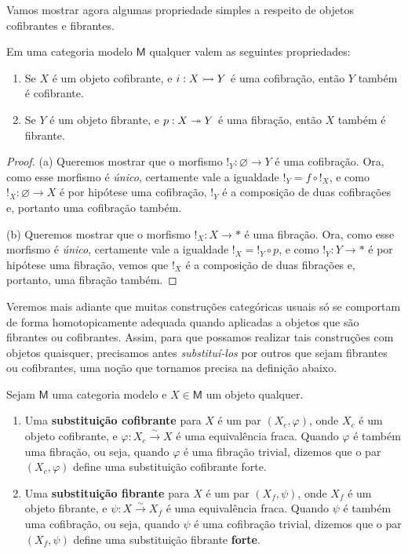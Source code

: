 Vamos mostrar agora algumas propriedade simples a respeito de objetos cofibrantes e fibrantes.

\begin{lema}\label{lema:props_obj_cofib_fib}
  Em uma categoria modelo $\mathsf{M}$ qualquer valem as seguintes propriedades:
  \begin{enumerate}
  \item[(a)] Se $X$ é um objeto cofibrante, e $i: X \rightarrowtail Y$ é uma cofibração, então $Y$ também é cofibrante.
    
  \item[(b)] Se $Y$ é um objeto fibrante, e $p: X \twoheadrightarrow Y$ é uma fibração, então $X$ também é fibrante.
  \end{enumerate}
\end{lema}

\begin{proof}
  (a) Queremos mostrar que o morfismo $!_{Y}: \varnothing \to Y$ é uma cofibração.
  Ora, como esse morfismo é \emph{único}, certamente vale a igualdade $!_{Y} = f \circ !_{X}$, e como $!_{X}: \varnothing \to X$ é por hipótese uma cofibração, $!_{Y}$ é a composição de duas cofibrações e, portanto uma cofibração também.

  \smallskip
  (b) Queremos mostrar que o morfismo $!_{X}: X \to *$ é uma fibração.
  Ora, como esse morfismo é \emph{único}, certamente vale a igualdade $!_{X} = !_{Y} \circ p$, e como $!_{Y}: Y \to *$ é por hipótese uma fibração, vemos que $!_{X}$ é a composição de duas fibrações e, portanto, uma fibração também.
\end{proof}

Veremos mais adiante que muitas construções categóricas usuais só se comportam de forma homotopicamente adequada quando aplicadas a objetos que são fibrantes ou cofibrantes.
Assim, para que possamos realizar tais construções com objetos quaisquer, precisamos antes \emph{substituí-los} por outros que sejam fibrantes ou cofibrantes, uma noção que tornamos precisa na definição abaixo.

\begin{defin}
  Sejam $\mathsf{M}$ uma categoria modelo e $X \in \mathsf{M}$ um objeto qualquer.
  \begin{enumerate}
  \item Uma \textbf{substituição cofibrante} para $X$ é um par $(X_{c},\varphi)$, onde $X_{c}$ é um objeto cofibrante, e $\varphi: X_{c} \overset{\sim}{\to} X$ é uma equivalência fraca.
    Quando $\varphi$ é também uma fibração, ou seja, quando $\varphi$ é uma fibração trivial, dizemos que o par $(X_{c},\varphi)$ define uma substituição cofibrante forte.
    
  \item Uma \textbf{substituição fibrante} para $X$ é um par $(X_{f},\psi)$, onde $X_{f}$ é um objeto fibrante, e $\psi: X \overset{\sim}{\to} X_{f}$ é uma equivalência fraca.
    Quando $\psi$ é também uma cofibração, ou seja, quando $\psi$ é uma cofibração trivial, dizemos que o par $(X_{f},\psi)$ define uma substituição fibrante \textbf{forte}.
  \end{enumerate}
\end{defin}

